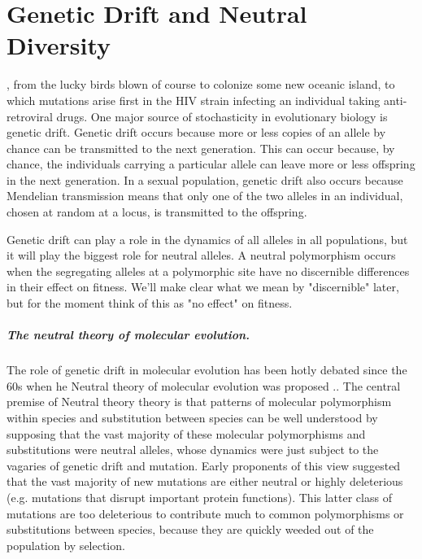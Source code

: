 \chapter{Genetic Drift and Neutral Diversity}

, from the lucky birds blown of course to colonize some new oceanic island, to which mutations arise first in the HIV strain infecting an individual taking anti-retroviral drugs. One major source of stochasticity in evolutionary biology is genetic drift.  Genetic drift occurs because more or less copies of an allele by chance can be transmitted to the next generation. This can occur because, by chance, the individuals carrying a particular allele can leave more or less offspring in the next generation. In a
sexual population, genetic drift also occurs because Mendelian transmission
means that only one of the two alleles in an individual, chosen at random at a
locus, is transmitted to the offspring. 

Genetic drift can play a role in the dynamics of all alleles in all populations, but it will play the biggest role for neutral alleles. A neutral polymorphism occurs when the segregating alleles at a polymorphic site have no discernible differences in their effect on fitness. We'll make clear what we mean by "discernible" later, but for
the moment think of this as "no effect" on fitness. 
\paragraph{The neutral theory of molecular evolution.} 
The role of genetic drift in molecular evolution has been hotly debated since the 60s when he Neutral theory of molecular evolution was proposed \citep[see ][ for a history]{ohta1996development}.\cite{kimura:68,king:69,kimura:83}.  The central premise of Neutral theory theory is that patterns of molecular polymorphism within species and substitution between species can be well understood by supposing that the vast majority of these molecular polymorphisms and substitutions were neutral alleles, whose dynamics were just subject to the vagaries of genetic drift and mutation. Early proponents of this view suggested that the vast majority of new mutations are either neutral or highly deleterious (e.g. mutations that disrupt important protein functions). This latter class of mutations are too deleterious to contribute much to common polymorphisms or substitutions between species, because they are quickly weeded out of the population by selection. 

